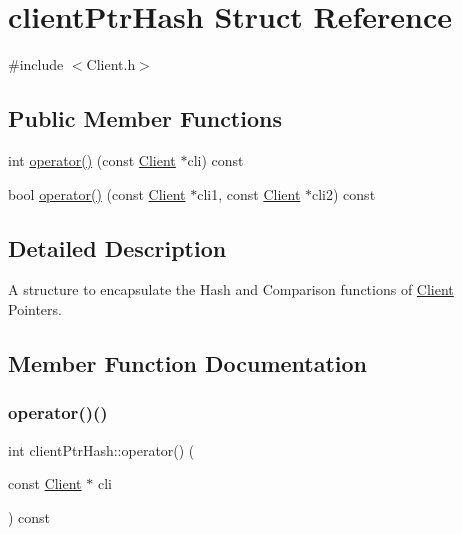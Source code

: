 \hypertarget{structclient_ptr_hash}{}\section{client\+Ptr\+Hash Struct Reference}
\label{structclient_ptr_hash}


{\ttfamily \#include $<$Client.\+h$>$}

\subsection*{Public Member Functions}
\begin{DoxyCompactItemize}
\item 
int \hyperlink{structclient_ptr_hash_ac49312a0983336d28135483f5e2c4f5c}{operator()} (const \hyperlink{class_client}{Client} $\ast$cli) const
\item 
bool \hyperlink{structclient_ptr_hash_adb7164b667757ee8091c7b7337b1be2b}{operator()} (const \hyperlink{class_client}{Client} $\ast$cli1, const \hyperlink{class_client}{Client} $\ast$cli2) const
\end{DoxyCompactItemize}


\subsection{Detailed Description}
A structure to encapsulate the Hash and Comparison functions of \hyperlink{class_client}{Client} Pointers. 

\subsection{Member Function Documentation}
\hypertarget{structclient_ptr_hash_ac49312a0983336d28135483f5e2c4f5c}{}\label{structclient_ptr_hash_ac49312a0983336d28135483f5e2c4f5c} 
\subsubsection{\texorpdfstring{operator()()}{operator()()}\hspace{0.1cm}{\footnotesize\ttfamily [1/2]}}
{\footnotesize\ttfamily int client\+Ptr\+Hash\+::operator() (\begin{DoxyParamCaption}\item[{const \hyperlink{class_client}{Client} $\ast$}]{cli }\end{DoxyParamCaption}) const\hspace{0.3cm}{\ttfamily [inline]}}

